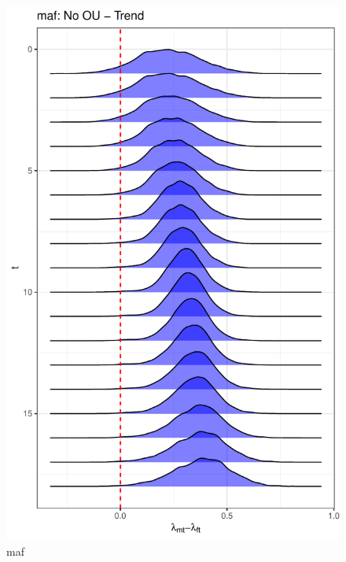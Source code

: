 \documentclass[
  12pt,
]{article}
\begin{document}
\begin{figure}

{\centering \includegraphics[width=0.9\linewidth]{../Figures/maf/lambda_diff} 

}

\caption{maf}\label{fig:unnamed-chunk-14}
\end{figure}
\end{document}
